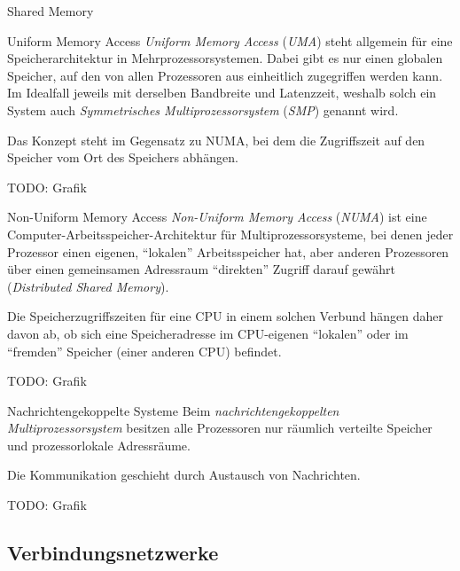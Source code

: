 \begin{defi}{Shared Memory}
    \begin{defi}{Uniform Memory Access}
        \emph{Uniform Memory Access} (\emph{UMA}) steht allgemein für eine Speicherarchitektur in Mehrprozessorsystemen.
        Dabei gibt es nur einen globalen Speicher, auf den von allen Prozessoren aus einheitlich zugegriffen werden kann.
        Im Idealfall jeweils mit derselben Bandbreite und Latenzzeit, weshalb solch ein System auch \emph{Symmetrisches Multiprozessorsystem} (\emph{SMP}) genannt wird.

        Das Konzept steht im Gegensatz zu NUMA, bei dem die Zugriffszeit auf den Speicher vom Ort des Speichers abhängen.

        TODO: Grafik
    \end{defi}

    \begin{defi}{Non-Uniform Memory Access}
        \emph{Non-Uniform Memory Access} (\emph{NUMA}) ist eine Computer-Arbeitsspeicher-Architektur für Multiprozessorsysteme, bei denen jeder Prozessor einen eigenen, \enquote{lokalen} Arbeitsspeicher hat, aber anderen Prozessoren über einen gemeinsamen Adressraum \enquote{direkten} Zugriff darauf gewährt (\emph{Distributed Shared Memory}).

        Die Speicherzugriffszeiten für eine CPU in einem solchen Verbund hängen daher davon ab, ob sich eine Speicheradresse im CPU-eigenen \enquote{lokalen} oder im \enquote{fremden} Speicher (einer anderen CPU) befindet.

        TODO: Grafik
    \end{defi}

    \begin{defi}{Nachrichtengekoppelte Systeme}
        Beim \emph{nachrichtengekoppelten Multiprozessorsystem} besitzen alle Prozessoren nur räumlich verteilte Speicher und prozessorlokale Adressräume.

        Die Kommunikation geschieht durch Austausch von Nachrichten.

        TODO: Grafik
    \end{defi}

    \subsection{Verbindungsnetzwerke}


\end{defi}

